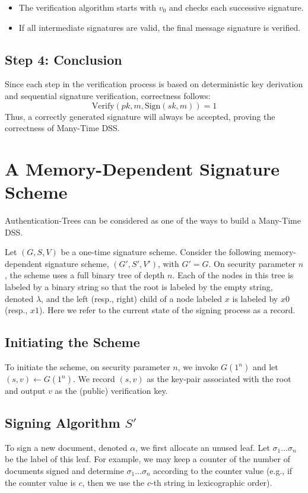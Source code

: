 \begin{itemize}
    \item The verification algorithm starts with \( v_0 \) and checks each successive signature.
    \item If all intermediate signatures are valid, the final message signature is verified.
\end{itemize}

\subsection{Step 4: Conclusion}
Since each step in the verification process is based on deterministic key derivation and sequential signature verification, correctness follows:
\begin{equation}
    \text{Verify}(pk, m, \text{Sign}(sk, m)) = 1
\end{equation}
Thus, a correctly generated signature will always be accepted, proving the correctness of Many-Time DSS.


\section{A Memory-Dependent Signature Scheme}

Authentication-Trees can be considered as one of the ways to build a Many-Time DSS.

Let $(G, S, V)$ be a one-time signature scheme. Consider the following memory-dependent signature scheme, $(G', S', V')$, with $G' = G$. On security parameter $n$, the scheme uses a full binary tree of depth $n$. Each of the nodes in this tree is labeled by a binary string so that the root is labeled by the empty string, denoted $\lambda$, and the left (resp., right) child of a node labeled $x$ is labeled by $x0$ (resp., $x1$). Here we refer to the current state of the signing process as a record.

\subsection{Initiating the Scheme}
To initiate the scheme, on security parameter $n$, we invoke $G(1^n)$ and let $(s, v) \leftarrow G(1^n)$. We record $(s, v)$ as the key-pair associated with the root and output $v$ as the (public) verification key.

\subsection{Signing Algorithm $S'$}
To sign a new document, denoted $\alpha$, we first allocate an unused leaf. Let $\sigma_1 \dots \sigma_n$ be the label of this leaf. For example, we may keep a counter of the number of documents signed and determine $\sigma_1 \dots \sigma_n$ according to the counter value (e.g., if the counter value is $c$, then we use the $c$-th string in lexicographic order).

